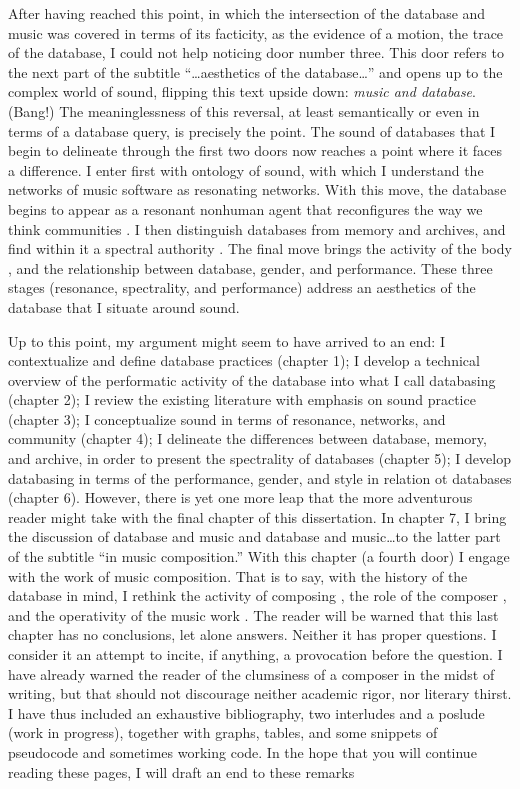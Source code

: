 After having reached this point, in which the intersection of the database and music was covered in terms of its facticity, as the evidence of a motion, the trace of the database, I could not help noticing door number three. This door refers to the next part of the subtitle ``\dots aesthetics of the database\dots'' and opens up to the complex world of sound, flipping this text upside down: \textit{music and database}. (Bang!) The meaninglessness of this reversal, at least semantically or even in terms of a database query, is precisely the point. The sound of databases that I begin to delineate through the first two doors now reaches a point where it faces a difference. I enter first with  ontology of sound, with which I understand the networks of music software as resonating networks. With this move, the database begins to appear as a resonant nonhuman agent \parencite{Lat90:On} that reconfigures the way we think communities \parencite{Nan91:The}. I then distinguish databases from memory and archives, and find within it a spectral authority \parencites{Der78:Wri}{Der95:Arc}. The final move brings the activity of the body \parencite{But88:Per}, and the relationship between database, gender, and performance. These three stages (resonance, spectrality, and performance) address an aesthetics of the database that I situate around sound. 

Up to this point, my argument might seem to have arrived to an end: I contextualize and define database practices (chapter 1); I develop a technical overview of the performatic activity of the database into what I call databasing (chapter 2); I review the existing literature with emphasis on sound practice (chapter 3); I conceptualize sound in terms of resonance, networks, and community (chapter 4); I delineate the differences between database, memory, and archive, in order to present the spectrality of databases (chapter 5); I develop databasing in terms of the performance, gender, and style in relation ot databases (chapter 6). However, there is yet one more leap that the more adventurous reader might take with the final chapter of this dissertation. In chapter 7, I bring the discussion of database and music and database and music\dots to the latter part of the subtitle ``in music composition.'' With this chapter (a fourth door) I engage with the work of music composition. That is to say, with the history of the database in mind, I rethink the activity of composing \parencite{Vag01:Som}, the role of the composer \parencite{Lew99:Int}, and the operativity of the music work \parencite{Cas00:The}. The reader will be warned that this last chapter has no conclusions, let alone answers. Neither it has proper questions. I consider it an attempt to incite, if anything, a provocation before the question. I have already warned the reader of the clumsiness of a composer in the midst of writing, but that should not discourage neither academic rigor, nor literary thirst. I have thus included an exhaustive bibliography, two interludes and a poslude (work in progress), together with graphs, tables, and some snippets of pseudocode and sometimes working code. In the hope that you will continue reading these pages, I will {draft} an end to these remarks
